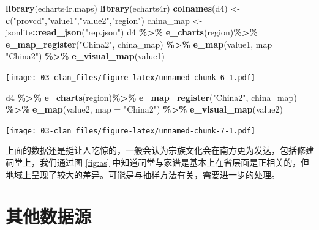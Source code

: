 \documentclass[
  oneside]{book}
\newenvironment{Shaded}{\begin{snugshade}}{\end{snugshade}}
\newcommand{\AttributeTok}[1]{\textcolor[rgb]{0.13,0.29,0.53}{#1}}
\newcommand{\FunctionTok}[1]{\textcolor[rgb]{0.13,0.29,0.53}{\textbf{#1}}}
\newcommand{\NormalTok}[1]{#1}
\newcommand{\OtherTok}[1]{\textcolor[rgb]{0.56,0.35,0.01}{#1}}
\newcommand{\SpecialCharTok}[1]{\textcolor[rgb]{0.81,0.36,0.00}{\textbf{#1}}}
\newcommand{\StringTok}[1]{\textcolor[rgb]{0.31,0.60,0.02}{#1}}
\begin{document}
\begin{Shaded}
\begin{Highlighting}[]
\FunctionTok{library}\NormalTok{(echarts4r.maps)}
\FunctionTok{library}\NormalTok{(echarts4r)}
\FunctionTok{colnames}\NormalTok{(d4) }\OtherTok{\textless{}{-}} \FunctionTok{c}\NormalTok{(}\StringTok{"provcd"}\NormalTok{,}\StringTok{"value1"}\NormalTok{,}\StringTok{"value2"}\NormalTok{,}\StringTok{"region"}\NormalTok{)}
\NormalTok{china\_map }\OtherTok{\textless{}{-}}\NormalTok{ jsonlite}\SpecialCharTok{::}\FunctionTok{read\_json}\NormalTok{(}\StringTok{"rep.json"}\NormalTok{)}
\NormalTok{d4 }\SpecialCharTok{\%\textgreater{}\%}
  \FunctionTok{e\_charts}\NormalTok{(region)}\SpecialCharTok{\%\textgreater{}\%}
  \FunctionTok{e\_map\_register}\NormalTok{(}\StringTok{"China2"}\NormalTok{, china\_map) }\SpecialCharTok{\%\textgreater{}\%}
  \FunctionTok{e\_map}\NormalTok{(value1, }\AttributeTok{map =} \StringTok{"China2"}\NormalTok{) }\SpecialCharTok{\%\textgreater{}\%}
  \FunctionTok{e\_visual\_map}\NormalTok{(value1)}
\end{Highlighting}
\end{Shaded}

\texttt{[image: 03-clan\_files/figure-latex/unnamed-chunk-6-1.pdf]}

\begin{Shaded}
\begin{Highlighting}[]
\NormalTok{d4 }\SpecialCharTok{\%\textgreater{}\%}
  \FunctionTok{e\_charts}\NormalTok{(region)}\SpecialCharTok{\%\textgreater{}\%}
  \FunctionTok{e\_map\_register}\NormalTok{(}\StringTok{"China2"}\NormalTok{, china\_map) }\SpecialCharTok{\%\textgreater{}\%}
  \FunctionTok{e\_map}\NormalTok{(value2, }\AttributeTok{map =} \StringTok{"China2"}\NormalTok{) }\SpecialCharTok{\%\textgreater{}\%}
  \FunctionTok{e\_visual\_map}\NormalTok{(value2)}
\end{Highlighting}
\end{Shaded}

\texttt{[image: 03-clan\_files/figure-latex/unnamed-chunk-7-1.pdf]}

上面的数据还是挺让人吃惊的，一般会认为宗族文化会在南方更为发达，包括修建祠堂上，我们通过图 \ref{fig:as} 中知道祠堂与家谱是基本上在省层面是正相关的，但地域上呈现了较大的差异。可能是与抽样方法有关，需要进一步的处理。

\hypertarget{ux5176ux4ed6ux6570ux636eux6e90}{%
\section{其他数据源}\label{ux5176ux4ed6ux6570ux636eux6e90}}
\end{document}
